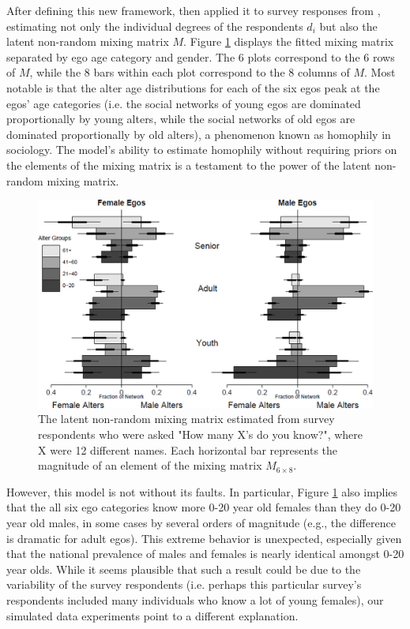 After defining this new framework, \citet{McCormick+others:2010} then applied it to survey responses from \citet{McCarty+others:2001}, estimating not only the individual degrees of the respondents $d_i$ but also the latent non-random mixing matrix $M$. Figure \ref{fig:nonrandom_mixing_matrix} displays the fitted mixing matrix separated by ego age category and gender. The 6 plots correspond to the 6 rows of $M$, while the 8 bars within each plot correspond to the 8 columns of $M$. Most notable is that the alter age distributions for each of the six egos peak at the egos' age categories (i.e. the social networks of young egos are dominated proportionally by young alters, while the social networks of old egos are dominated proportionally by old alters), a phenomenon known as homophily in sociology. The model's ability to estimate homophily without requiring priors on the elements of the mixing matrix is a testament to the power of the latent non-random mixing matrix. 

\begin{figure}
\includegraphics[width=\textwidth]{figures/mccr_latent_mix.jpg}
\caption{The latent non-random mixing matrix estimated from survey respondents who were asked "How many X's do you know?", where X were 12 different names. Each horizontal bar represents the magnitude of an element of the mixing matrix $M_{6 \times 8}$.}
\label{fig:nonrandom_mixing_matrix}
\end{figure}

However, this model is not without its faults. In particular, Figure \ref{fig:nonrandom_mixing_matrix} also implies that the all six ego categories know more 0-20 year old females than they do 0-20 year old males, in some cases by several orders of magnitude (e.g., the difference is dramatic for adult egos). This extreme behavior is unexpected, especially given that the national prevalence of males and females is nearly identical amongst 0-20 year olds. While it seems plausible that such a result could be due to the variability of the survey respondents (i.e. perhaps this particular survey's respondents included many individuals who know a lot of young females), our simulated data experiments point to a different explanation. 

